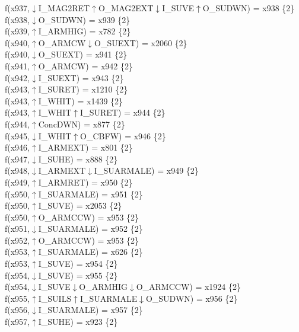 f(x937,$\downarrow$I\_MAG2RET$\uparrow$O\_MAG2EXT$\downarrow$I\_SUVE$\uparrow$O\_SUDWN) = x938 \{2\} \\  
f(x938,$\downarrow$O\_SUDWN) = x939 \{2\} \\  
f(x939,$\uparrow$I\_ARMHIG) = x782 \{2\} \\  
f(x940,$\uparrow$O\_ARMCW$\downarrow$O\_SUEXT) = x2060 \{2\} \\  
f(x940,$\downarrow$O\_SUEXT) = x941 \{2\} \\  
f(x941,$\uparrow$O\_ARMCW) = x942 \{2\} \\  
f(x942,$\downarrow$I\_SUEXT) = x943 \{2\} \\  
f(x943,$\uparrow$I\_SURET) = x1210 \{2\} \\  
f(x943,$\uparrow$I\_WHIT) = x1439 \{2\} \\  
f(x943,$\uparrow$I\_WHIT$\uparrow$I\_SURET) = x944 \{2\} \\  
f(x944,$\uparrow$ConcDWN) = x877 \{2\} \\  
f(x945,$\downarrow$I\_WHIT$\uparrow$O\_CBFW) = x946 \{2\} \\  
f(x946,$\uparrow$I\_ARMEXT) = x801 \{2\} \\  
f(x947,$\downarrow$I\_SUHE) = x888 \{2\} \\  
f(x948,$\downarrow$I\_ARMEXT$\downarrow$I\_SUARMALE) = x949 \{2\} \\  
f(x949,$\uparrow$I\_ARMRET) = x950 \{2\} \\  
f(x950,$\uparrow$I\_SUARMALE) = x951 \{2\} \\  
f(x950,$\uparrow$I\_SUVE) = x2053 \{2\} \\  
f(x950,$\uparrow$O\_ARMCCW) = x953 \{2\} \\  
f(x951,$\downarrow$I\_SUARMALE) = x952 \{2\} \\  
f(x952,$\uparrow$O\_ARMCCW) = x953 \{2\} \\  
f(x953,$\uparrow$I\_SUARMALE) = x626 \{2\} \\  
f(x953,$\uparrow$I\_SUVE) = x954 \{2\} \\  
f(x954,$\downarrow$I\_SUVE) = x955 \{2\} \\  
f(x954,$\downarrow$I\_SUVE$\downarrow$O\_ARMHIG$\downarrow$O\_ARMCCW) = x1924 \{2\} \\  
f(x955,$\uparrow$I\_SUILS$\uparrow$I\_SUARMALE$\downarrow$O\_SUDWN) = x956 \{2\} \\  
f(x956,$\downarrow$I\_SUARMALE) = x957 \{2\} \\  
f(x957,$\uparrow$I\_SUHE) = x923 \{2\} \\  
